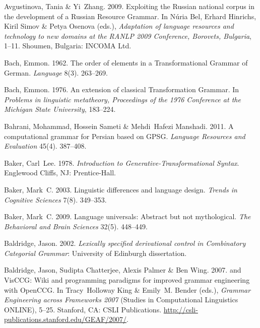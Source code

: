 \begin{thebibliography}{1420}
Avgustinova, Tania \& Yi~Zhang. 2009.
\newblock Exploiting the {Russian} national corpus in the development of a
  {Russian Resource Grammar}.
\newblock In N{\'u}ria Bel, Erhard Hinrichs, Kiril Simov \& Petya Osenova
  (eds.), \emph{Adaptation of language resources and technology to new domains
  at the {RANLP 2009 Conference, Borovets, Bulgaria}}, 1--11. Shoumen,
  Bulgaria: INCOMA Ltd.

Bach, Emmon. 1962.
\newblock The order of elements in a {Transformational Grammar} of {German}.
\newblock \emph{Language} 8(3). 263--269.

Bach, Emmon. 1976.
\newblock An extension of classical {Transformation Grammar}.
\newblock In \emph{Problems in linguistic metatheory, {Proceedings} of the
  {1976 Conference at the Michigan State University}}, 183--224.

Bahrani, Mohammad, Hossein Sameti \& Mehdi~Hafezi Manshadi. 2011.
\newblock A computational grammar for {Persian} based on {GPSG}.
\newblock \emph{Language Resources and Evaluation} 45(4). 387--408.

Baker, Carl~Lee. 1978.
\newblock \emph{Introduction to {Generative-Transformational Syntax}}.
\newblock Englewood Cliffs, NJ: Prentice-Hall.

Baker, Mark~C. 2003.
\newblock Linguistic differences and language design.
\newblock \emph{Trends in Cognitive Sciences} 7(8). 349--353.

Baker, Mark~C. 2009.
\newblock Language universals: {Abstract} but not mythological.
\newblock \emph{The Behavioral and Brain Sciences} 32(5). 448--449.

Baldridge, Jason. 2002.
\newblock \emph{Lexically specified derivational control in {Combinatory
  Categorial Grammar}}: University of Edinburgh dissertation.

Baldridge, Jason, Sudipta Chatterjee, Alexis Palmer \& Ben Wing. 2007.
 and {VisCCG}: {Wiki} and programming paradigms for improved
  grammar engineering with {OpenCCG}.
\newblock In Tracy~Holloway King \& Emily~M. Bender (eds.), \emph{{Grammar
  Engineering across Frameworks 2007}}  (Studies in Computational Linguistics
  ONLINE), 5--25. Stanford, CA: CSLI Publications.
\newblock \urlprefix\url{http://csli-publications.stanford.edu/GEAF/2007/}.


\end{thebibliography}
